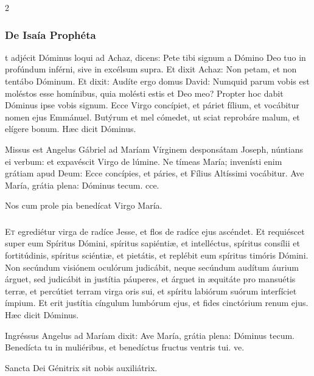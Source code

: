 \documentclass[9pt,twoside]{extarticle}
\begin{document}
\begin{multicols}{2}
\subsubsection*{\center De Isaía Prophéta}
\begin{center}\end{center}
t adjécit Dóminus loqui ad Achaz, dicens:
Pete tibi signum a Dómino Deo tuo in profúndum inférni, sive in excélsum supra.
Et dixit Achaz: Non petam, et non tentábo Dóminum.
Et dixit: Audíte ergo domus David: Numquid parum vobis est moléstos esse homínibus, quia molésti estis et Deo meo?
Propter hoc dabit Dóminus ipse vobis signum. Ecce Virgo concípiet, et páriet fílium, et vocábitur nomen ejus Emmánuel.
Butýrum et mel cómedet, ut sciat reprobáre malum, et elígere bonum. Hæc dicit Dóminus.

\begin{tightlist}{}
\item {} Missus est Angelus Gábriel ad Maríam Vírginem desponsátam Joseph, núntians ei verbum: et expavéscit Virgo de lúmine. Ne tímeas María; invenísti enim grátiam apud Deum: \textred{*} Ecce concípies, et páries, et Fílius Altíssimi vocábitur.   Ave María, grátia plena: Dóminus tecum. cce.
\item {\small {} Nos cum prole pia benedícat Virgo María.}
\end{tightlist}

\subsubsection*{}
\lettrine{E}t egrediétur virga de radíce Jesse, et flos de radíce ejus ascéndet.
Et requiéscet super eum Spíritus Dómini, spíritus sapiéntiæ, et intelléctus, spíritus consílii et fortitúdinis, spíritus sciéntiæ, et pietátis,
et replébit eum spíritus timóris Dómini. Non secúndum visiónem oculórum judicábit, neque secúndum audítum áurium árguet,
sed judicábit in justítia páuperes, et árguet in æquitáte pro mansuétis terræ, et percútiet terram virga oris sui, et spíritu labiórum suórum interfíciet ímpium.
Et erit justítia cíngulum lumbórum ejus, et fides cinctórium renum ejus.
Hæc dicit Dóminus.

\begin{tightlist}{}
\item {} Ingréssus Angelus ad Maríam dixit: \textred{*} Ave María, grátia plena: Dóminus tecum.  Benedícta tu in muliéribus, et benedíctus fructus ventris tui. ve.
\item {\small {} Sancta Dei Génitrix sit nobis auxiliátrix.}
\end{tightlist}


\end{multicols}
\end{document}
